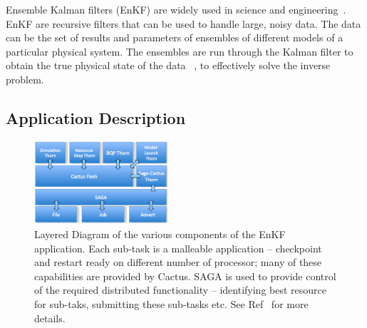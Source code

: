 \documentclass[conference,final]{IEEEtran}
\newcommand{\up}{\vspace*{-1em}}
\begin{document}
Ensemble Kalman filters (EnKF) are widely used in science and
engineering~\cite{DataAssim, KalmanPaper, LiEnKF07, DO2007, DO2006}.
EnKF are recursive filters that can be used to handle large, noisy
data. The data can be the set of results and parameters of ensembles
of different models of a particular physical system. The ensembles are
run through the Kalman filter to obtain the true physical state of the
data ~\cite{DataAssim,KalmanPaper}, to effectively solve the inverse
problem.

\up

\subsection{Application Description}

\up

\up
\begin{figure}[htbp]
    \centering
    \includegraphics[width=0.44\textwidth]{kalmanfilterlayer.png}
    \caption{Layered Diagram of the various components of the EnKF
      application. Each sub-task is a malleable application --
      checkpoint and restart ready on different number of processor;
      many of these capabilities are provided by Cactus.  SAGA is used
      to provide control of the required distributed functionality --
      identifying best resource for sub-taks, submitting these
      sub-tasks etc. See Ref~\cite{saga_tg08} for more details.\up\up}
    \label{fig:kalmanfilter}
\end{figure}  
\end{document}

